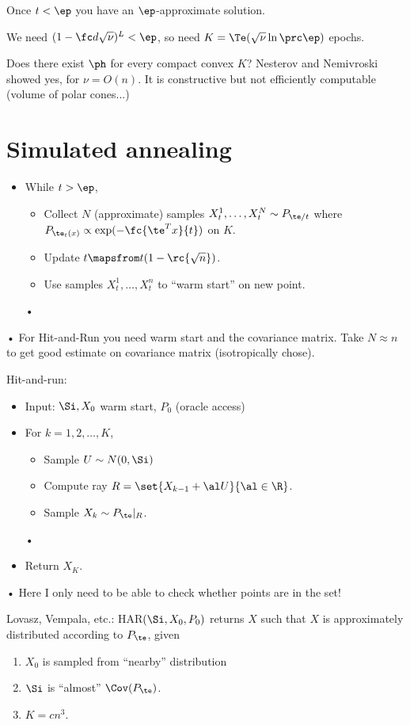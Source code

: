 Once $t<\ep$ you have an $\ep$-approximate solution. 


We need $(1-\fc d{\sqrt \nu})^L<\ep$, so need $K=\Te(\sqrt \nu \ln \prc\ep)$ epochs.


Does there exist $\ph$ for every compact convex $K$?
Nesterov and Nemivroski showed yes, for $\nu=O(n)$. It is constructive but not efficiently computable (volume of polar cones...)

\section{Simulated annealing}

\begin{itemize}
\item
While $t>\ep$,
\begin{itemize}
\item
Collect $N$ (approximate) samples $X_t^1,\ldots, X_t^N\sim P_{\te/t}$ where $P_{\te_t(x)} \propto \exp(-\fc{\te^Tx}{t})$ on $K$.
\item 
Update $t\mapsfrom t(1-\rc{\sqrt n})$.
\item
Use samples $X_t^1,\ldots, X_t^n$ to ``warm start'' on new point.
\end{itemize}•
\end{itemize}•
For Hit-and-Run you need warm start and the covariance matrix. Take $N\approx n$ to get good estimate on covariance matrix (isotropically chose). 

Hit-and-run:
\begin{itemize}
\item
Input: $\Si, X_0$ warm start, $P_0$ (oracle access)
\item
For $k=1,2,\ldots,K$,
\begin{itemize}
\item
Sample $U\sim N(0,\Si)$
\item
Compute ray $R=\set{X_{k-1}+\al U}{\al\in \R}$.
\item
Sample $X_k \sim P_\te|_R$.
\end{itemize}•
\item
Return $X_K$.
\end{itemize}•
Here I only need to be able to check whether points are in the set!

Lovasz, Vempala, etc.: HAR$(\Si, X_0,P_0)$ returns $X$ such that $X$ is approximately distributed according to $P_\te$, given
\begin{enumerate}
\item
$X_0$ is sampled from ``nearby'' distribution
\item
$\Si$ is ``almost'' $\Cov(P_\te)$.
\item
$K=cn^3$.
\end{enumerate}


